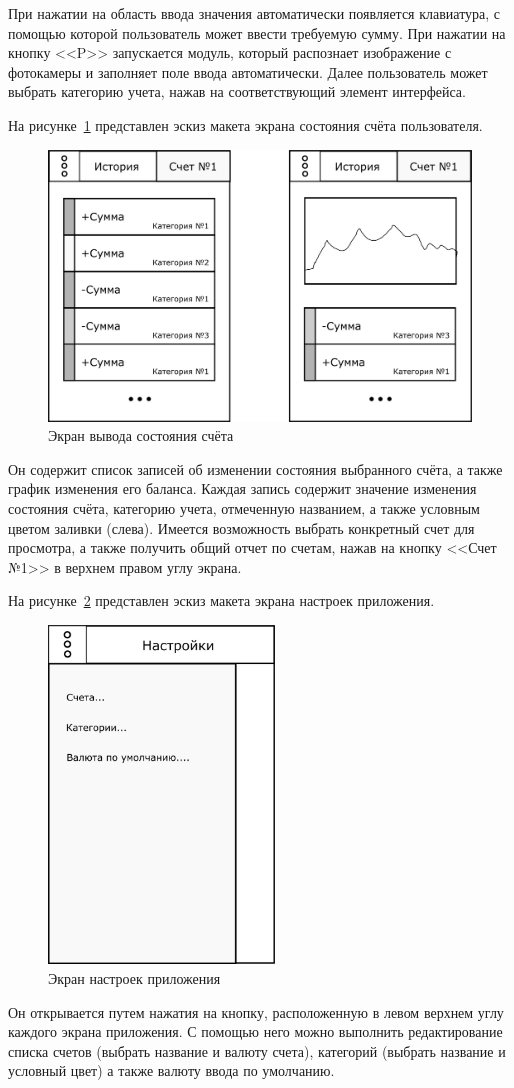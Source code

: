 При нажатии на область ввода значения автоматически появляется клавиатура,
с помощью которой пользователь может ввести требуемую сумму.
При нажатии на кнопку <<P>> запускается модуль, который распознает изображение
с фотокамеры и заполняет поле ввода автоматически.
Далее пользователь может выбрать категорию учета,
нажав на соответствующий элемент интерфейса.

\pagebreak
На рисунке~\ref{fig:screen_reports} представлен эскиз макета экрана состояния
счёта пользователя.

\begin{figure}[h!]
  \centering
  \includegraphics[width=130mm]{pic/screen_reports}
  \caption{Экран вывода состояния счёта}
  \label{fig:screen_reports}
\end{figure}

Он содержит список записей об изменении состояния выбранного счёта,
а также график изменения его баланса.
Каждая запись содержит значение изменения состояния счёта, категорию
учета, отмеченную названием, а также условным цветом заливки (слева).
Имеется возможность выбрать конкретный счет для просмотра, а также
получить общий отчет по счетам, нажав на кнопку <<Счет №1>>
в верхнем правом углу экрана.

\pagebreak
На рисунке~\ref{fig:screen_settings} представлен эскиз макета экрана
настроек приложения.

\begin{figure}[h!]
  \centering
  \includegraphics[width=60mm]{pic/screen_settings}
  \caption{Экран настроек приложения}
  \label{fig:screen_settings}
\end{figure}

Он открывается путем нажатия на кнопку, расположенную в
левом верхнем углу каждого экрана приложения.
С помощью него можно выполнить редактирование списка счетов
(выбрать название и валюту счета),
категорий (выбрать название и условный цвет)
а также валюту ввода по умолчанию.